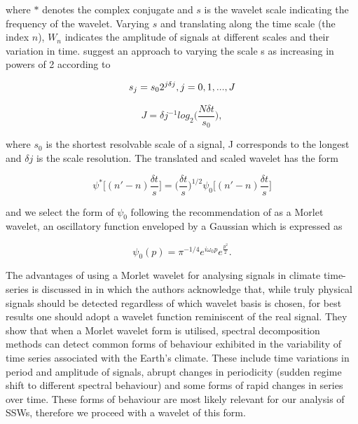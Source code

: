 where $*$ denotes the complex conjugate and $s$ is the wavelet scale indicating the frequency of the wavelet. Varying $s$ and translating along the time scale (the index $n$), $W_n$ indicates the amplitude of signals at different scales and their variation in time. \cite{Torrence1998} suggest an approach to varying the scale s as increasing in powers of 2 according to 

\begin{equation} \label{S}
s_j = s_0 2^{j \delta j},\\ j = 0, 1, ..., J
\end{equation}

\begin{equation} \label{S}
J = \delta j^{-1} log_2\bigg(\frac{N \delta t}{s_0}\bigg),
\end{equation}

where $s_0$ is the shortest resolvable scale of a signal, J corresponds to the longest and $\delta j$ is the scale resolution. The translated and scaled wavelet has the form

\begin{equation} \label{wavelet}
\psi^* \bigg[(n' - n) \frac{\delta t}{s}\bigg] = \bigg(\frac{\delta t}{s}\bigg)^{1/2} \psi_0\bigg[(n' - n) \frac{\delta t}{s}\bigg]
\end{equation}

and we select the form of $\psi_0$ following the recommendation of \cite{Torrence1998} as a Morlet wavelet, an oscillatory function enveloped by a Gaussian which is expressed as

\begin{equation} \label{psi0}
\psi_0(p) = \pi^{-1/4} e^{i\omega_0 p} e^{\frac{p^2}{2}}.
\end{equation}

The advantages of using a Morlet wavelet for analysing signals in climate time-series is discussed in \cite{lauClimate1995b} in which the authors acknowledge that, while truly physical signals should be detected regardless of which wavelet basis is chosen, for best results one should adopt a wavelet function reminiscent of the real signal. They show that when a Morlet wavelet form is utilised, spectral decomposition methods can detect common forms of behaviour exhibited in the variability of time series associated with the Earth's climate. These include time variations in period and amplitude of signals, abrupt changes in periodicity (sudden regime shift to different spectral behaviour) and some forms of rapid changes in series over time. These forms of behaviour are most likely relevant for our analysis of SSWs, therefore we proceed with a wavelet of this form. 

